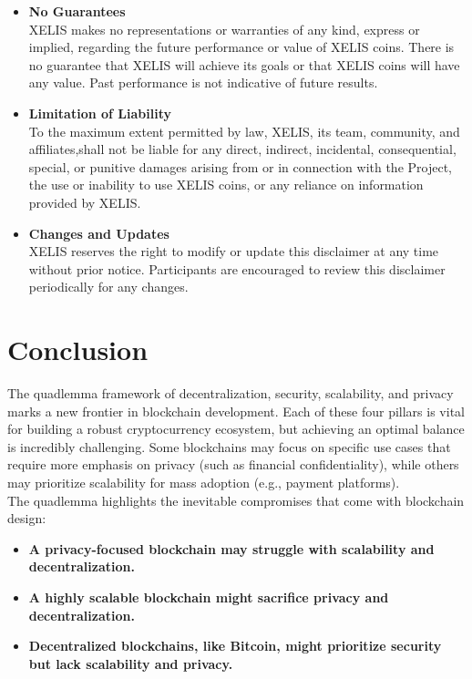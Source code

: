 \documentclass[12pt,a4paper,twocolumn]{article}
\begin{document}
\begin{itemize}
\item \textbf{No Guarantees}\\

XELIS makes no representations or warranties of any kind, express or implied, regarding the future performance or value of XELIS coins. There is no guarantee that XELIS will achieve its goals or that XELIS coins will have any value. Past performance is not indicative of future results.\\

\item \textbf{Limitation of Liability}\\

To the maximum extent permitted by law, XELIS, its team, community, and affiliates,shall not be liable for any direct, indirect, incidental, consequential, special, or punitive damages arising from or in connection with the Project, the use or inability to use XELIS coins, or any reliance on information provided by XELIS.\\

\item \textbf{Changes and Updates}\\

XELIS reserves the right to modify or update this disclaimer at any time without prior notice. Participants are encouraged to review this disclaimer periodically for any changes. 
\end{itemize}

 \section{Conclusion}
 
The quadlemma framework of decentralization, security, scalability, and privacy marks a new frontier in blockchain development. Each of these four pillars is vital for building a robust cryptocurrency ecosystem, but achieving an optimal balance is incredibly challenging. Some blockchains may focus on specific use cases that require more emphasis on privacy (such as financial confidentiality), while others may prioritize scalability for mass adoption (e.g., payment platforms).\\

The quadlemma highlights the inevitable compromises that come with blockchain design:

\begin{itemize}
    \item \textbf{A privacy-focused blockchain may struggle with scalability and decentralization.}
    \item \textbf{A highly scalable blockchain might sacrifice privacy and decentralization.}
    \item \textbf{Decentralized blockchains, like Bitcoin, might prioritize security but lack scalability and privacy.}
\end{itemize}
\end{document}
